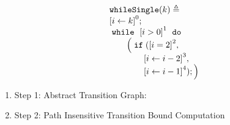 \begin{example}
    \label{ex:whileSigle}
    \[
      \begin{array}{l}
          \kw{whileSingle}(k) \triangleq \\
          \clabel{ \assign{i}{k} }^{0} ; \\
              \ewhile ~ \clabel{i > 0}^{1} ~ \edo ~ \\
              \qquad \Big(
                \eif(\clabel{i = 2 }^{2}, \\
                \qquad \qquad \clabel{\assign{i}{i - 2}}^{3},\\
                \qquad \qquad \clabel{\assign{i}{i - 1}}^{4});
                \Big)
          \end{array}
      \]
    
    \begin{enumerate}
      \item Step 1: Abstract Transition Graph:
    
    \item Step 2: Path Insensitive Transition Bound Computation
    

\end{enumerate}
\end{example}
